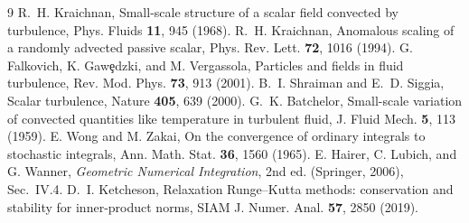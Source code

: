 \documentclass[aps,prfluids,reprint,onecolumn,amsmath,amssymb,nofootinbib,floatfix]{revtex4-2}
\begin{document}
\begin{thebibliography}{9}
 R.~H. Kraichnan, Small-scale structure of a scalar field
  convected by turbulence, Phys. Fluids \textbf{11}, 945 (1968).
 R.~H. Kraichnan, Anomalous scaling of a randomly
  advected passive scalar, Phys. Rev. Lett. \textbf{72}, 1016 (1994).
 G. Falkovich, K. Gaw\c{e}dzki, and M. Vergassola, Particles and
  fields in fluid turbulence, Rev. Mod. Phys. \textbf{73}, 913 (2001).
 B.~I. Shraiman and E.~D. Siggia, Scalar turbulence,
  Nature \textbf{405}, 639 (2000).
 G.~K. Batchelor, Small-scale variation of convected
  quantities like temperature in turbulent fluid, J. Fluid Mech. \textbf{5}, 113
  (1959).
 E. Wong and M. Zakai, On the convergence of ordinary
  integrals to stochastic integrals, Ann. Math. Stat. \textbf{36}, 1560 (1965).
 E. Hairer, C. Lubich, and G. Wanner, \emph{Geometric Numerical
  Integration}, 2nd ed. (Springer, 2006), Sec.~IV.4.
 D.~I. Ketcheson, Relaxation Runge--Kutta methods:
  conservation and stability for inner-product norms, SIAM J. Numer. Anal.
  \textbf{57}, 2850 (2019).
\end{thebibliography}
\end{document}
